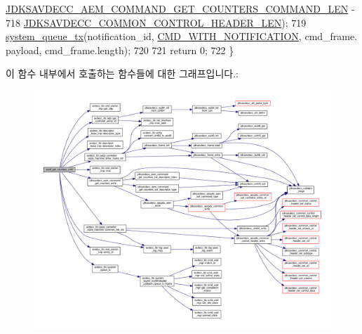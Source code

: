 \begin{DoxyCode}
      \hyperlink{group__command__get__counters_ga172bfd9e43b26f1b23588cdc172e6940}{JDKSAVDECC\_AEM\_COMMAND\_GET\_COUNTERS\_COMMAND\_LEN} -
718                                                            
      \hyperlink{group__jdksavdecc__avtp__common__control__header_gaae84052886fb1bb42f3bc5f85b741dff}{JDKSAVDECC\_COMMON\_CONTROL\_HEADER\_LEN});
719     \hyperlink{namespaceavdecc__lib_a6dd511685627c0865a3442b539a4e8e9}{system\_queue\_tx}(notification\_id, \hyperlink{namespaceavdecc__lib_aabcadff06aa62be0ce47bc0646823604aba48b8a017e06fb240b650cdea965178}{CMD\_WITH\_NOTIFICATION}, cmd\_frame.
      payload, cmd\_frame.length);
720 
721     \textcolor{keywordflow}{return} 0;
722 \}
\end{DoxyCode}


이 함수 내부에서 호출하는 함수들에 대한 그래프입니다.\+:
\nopagebreak
\begin{figure}[H]
\begin{center}
\leavevmode
\includegraphics[width=350pt]{classavdecc__lib_1_1stream__input__descriptor__imp_a619478ec7108e822b4c23f87c651b65a_cgraph}
\end{center}
\end{figure}


